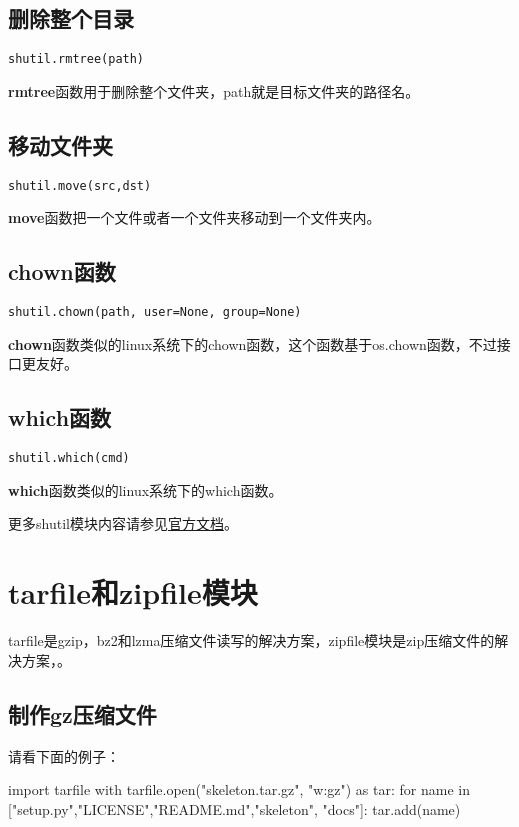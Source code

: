 \documentclass[12pt,oneside]{book}
\begin{document}
\begin{common-format}
\section{删除整个目录}
\begin{Verbatim}
shutil.rmtree(path)
\end{Verbatim}

\textbf{rmtree}函数用于删除整个文件夹，path就是目标文件夹的路径名。

\section{移动文件夹}
\begin{Verbatim}
shutil.move(src,dst)
\end{Verbatim}
\textbf{move}函数把一个文件或者一个文件夹移动到一个文件夹内。



\section{chown函数}
\begin{Verbatim}
shutil.chown(path, user=None, group=None)
\end{Verbatim}

\textbf{chown}函数类似的linux系统下的chown函数，这个函数基于os.chown函数，不过接口更友好。


\section{which函数}
\begin{Verbatim}
shutil.which(cmd)
\end{Verbatim}

\textbf{which}函数类似的linux系统下的which函数。



\begin{large}
更多shutil模块内容请参见\href{https://docs.python.org/3.4/library/shutil.html}{官方文档}。
\end{large}


\chapter{tarfile和zipfile模块}
tarfile是gzip，bz2和lzma压缩文件读写的解决方案，zipfile模块是zip压缩文件的解决方案，。

\section{制作gz压缩文件}
请看下面的例子：
\begin{tcbpython}[]
import tarfile
with tarfile.open("skeleton.tar.gz", "w:gz") as tar:
    for name in ["setup.py","LICENSE","README.md","skeleton", "docs"]:
        tar.add(name)
\end{tcbpython}


\end{common-format}
\end{document}

